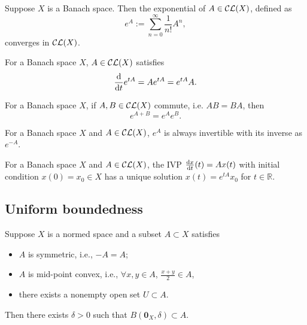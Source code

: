 \begin{thm}
  \label{thm:expOfOpCLX}
  Suppose $X$ is a Banach space. 
  Then the exponential of $A\in {\cal CL}(X)$,
  defined as
  \begin{equation}
    \label{eq:expOfOpCLX}
    e^A := \sum_{n=0}^{\infty} \frac{1}{n!} A^n, 
  \end{equation}
  converges in ${\cal CL}(X)$.
\end{thm}

\begin{lem}
  \label{lem:expOfOpCLX-Dt}
  For a Banach space $X$, 
  $A\in {\cal CL}(X)$ satisfies
  \begin{equation}
    \label{eq:expOfOpCLX-Dt}
   \frac{\mathrm{d}}{\mathrm{d} t} e^{tA} = A e^{tA} = e^{tA}A.
  \end{equation}
\end{lem}

\begin{lem}
  \label{lem:expOfOpCLX-commute}
  For a Banach space $X$, 
  if $A,B\in {\cal CL}(X)$ commute,
  i.e. $AB=BA$, 
  then 
  \begin{equation}
    \label{eq:expOfOpCLX-commute}
    e^{A+B} = e^{A}e^B.
  \end{equation}
\end{lem}

\begin{coro}
  \label{coro:expOfOpCLX-inverse}
  For a Banach space $X$
  and $A\in {\cal CL}(X)$,
  $e^A$ is always invertible
  with its inverse as $e^{-A}$.  
\end{coro}

\begin{thm}
  \label{thm:scalarODE-Banach}
  For a Banach space $X$ and $A\in {\cal CL}(X)$,
  the IVP
  $\frac{\mathrm{d} x}{\mathrm{d} t}(t) = A x(t)$ 
  with initial condition $x(0)=x_0\in X$
  has a unique solution $x(t)= e^{tA}x_0$ for $t\in \mathbb{R}$.
\end{thm}

\subsection{Uniform boundedness}
\label{sec:uniform-boundedness}

\begin{lem}
  \label{lem:SymmetricAndConvexAndOpenSet}
  Suppose $X$ is a normed space and a subset $A\subset X$
  satisfies
  \begin{itemize}\itemsep0em
  \item $A$ is symmetric, i.e., $-A=A$;
  \item $A$ is mid-point convex, i.e.,
    $\forall x,y\in A$, $\frac{x+y}{2}\in A$,
  \item there exists a nonempty open set $U\subset A$.
  \end{itemize}
  Then there exists $\delta>0$ such that
  $B(\mathbf{0}_X,\delta)\subset A$.
\end{lem}

